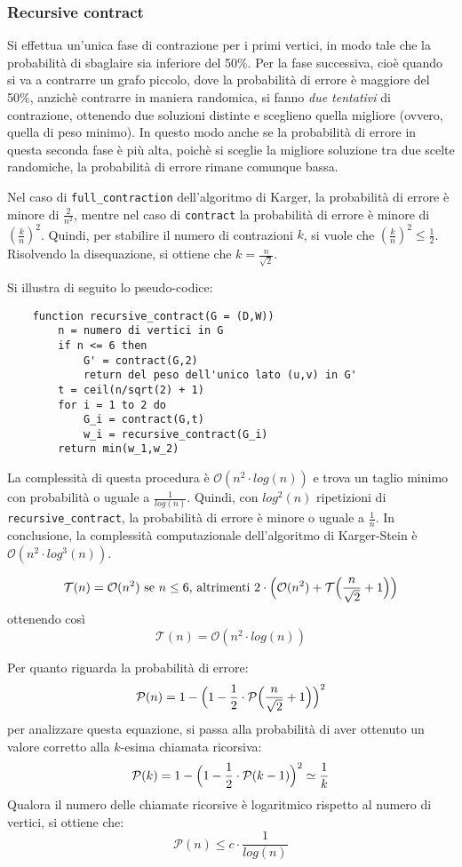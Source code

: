 \subsubsection*{Recursive contract}
Si effettua un'unica fase di contrazione per i primi vertici, in modo tale 
che la probabilità di sbaglaire sia inferiore del 50\%. Per la fase successiva, 
cioè quando si va a contrarre un grafo piccolo, dove la probabilità di errore è 
maggiore del 50\%, anzichè contrarre in maniera randomica, si fanno 
\textit{due tentativi} di contrazione, ottenendo due soluzioni distinte e sceglieno 
quella migliore (ovvero, quella di peso minimo). In questo modo anche se la probabilità 
di errore in questa seconda fase è più alta, poichè si sceglie la migliore soluzione 
tra due scelte randomiche, la probabilità di errore rimane comunque bassa.

Nel caso di \verb|full_contraction| dell'algoritmo di Karger, la probabilità di errore 
è minore di $\frac{2}{n^2}$, mentre nel caso di \verb|contract| la probabilità di 
errore è minore di $(\frac{k}{n})^2$. Quindi, per stabilire il numero di contrazioni 
$k$, si vuole che $(\frac{k}{n})^2 \le \frac{1}{2}$. Risolvendo la disequazione, si 
ottiene che $k = \frac{n}{\sqrt2}$.

Si illustra di seguito lo pseudo-codice:
\begin{verbatim}
    function recursive_contract(G = (D,W))
        n = numero di vertici in G 
        if n <= 6 then
            G' = contract(G,2)
            return del peso dell'unico lato (u,v) in G'
        t = ceil(n/sqrt(2) + 1)
        for i = 1 to 2 do
            G_i = contract(G,t)
            w_i = recursive_contract(G_i)
        return min(w_1,w_2)
\end{verbatim}
La complessità di questa procedura è $\mathcal{O}(n^2 \cdot log(n))$ e trova un 
taglio minimo con probabilità o uguale a $\frac{1}{log(n)}$. Quindi, con $log^2(n)$ 
ripetizioni di \verb|recursive_contract|, la probabilità di errore è minore o uguale 
a $\frac{1}{n}$. In conclusione, la complessità computazionale dell'algoritmo di 
Karger-Stein è $\mathcal{O}(n^2 \cdot log^3(n))$.

\[
    \mathcal{T}(n) = \mathcal{O}(n^2) \textnormal{ se } n \le 6 \textnormal{, altrimenti } 2 \cdot \Bigl(\mathcal{O}(n^2) + \mathcal{T}\Bigl(\frac{n}{\sqrt2} + 1\Bigr)\Bigr)  
\]
ottenendo così
\[
    \mathcal{T}(n) = \mathcal{O}(n^2 \cdot log(n))  
\]

Per quanto riguarda la probabilità di errore:
\[
    \mathcal{P}(n) = 1 - \Bigl(1 - \frac{1}{2} \cdot \mathcal{P}\Bigl(\frac{n}{\sqrt2} + 1\Bigr)\Bigr)^2
\]
per analizzare questa equazione, si passa alla probabilità di aver ottenuto un valore 
corretto alla $k$-esima chiamata ricorsiva:
\[
    \mathcal{P}(k) = 1 - \Bigl(1 - \frac{1}{2} \cdot \mathcal{P}(k - 1)\Bigr)^2 \simeq \frac{1}{k}
\]
Qualora il numero delle chiamate ricorsive è logaritmico rispetto al numero di vertici, 
si ottiene che:
\[
    \mathcal{P}(n) \le c \cdot \frac{1}{log(n)}
\]


